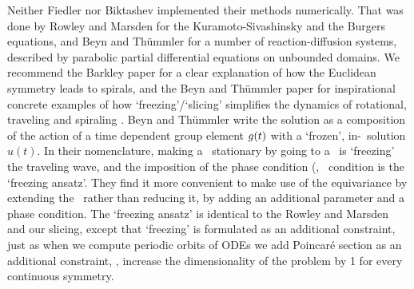 \documentclass[12pt]{article}
\begin{document}
{Neither Fiedler \etal{} nor Biktashev
\etal{} implemented their methods numerically.
That was done by Rowley and Marsden for the
Kuramoto-Sivashinsky and the
Burgers equations, and Beyn and
Th\"ummler for a number of
reaction-diffusion systems, described by parabolic partial
differential equations on unbounded domains. We recommend the
Barkley paper for a clear explanation of how
the Euclidean symmetry leads to spirals, and the Beyn and
Th\"ummler paper for inspirational concrete
examples of how `freezing'/\-`slicing' simplifies the
dynamics of rotational, traveling and spiraling \reqva.
Beyn and Th\"ummler write the solution as a composition of
the action of a time dependent group element $g(t)$ with
a `frozen', in-\slice\ solution $\hat{u}(t)$.
In their nomenclature, making a \reqv\
stationary by going to a \comovframe\ is `freezing' the
traveling wave, and the imposition of the phase condition
(\ie, \slice\ condition  is the `freezing
ansatz'.  They find it more convenient to make use of the
equi\-vari\-ance by extending the \statesp\ rather than reducing
it, by adding an additional parameter and a phase condition.
The `freezing ansatz' is identical to the Rowley
and Marsden and our slicing, except
that `freezing' is formulated as an additional constraint,
just as when we compute periodic orbits of ODEs we add
Poincar\'e section as an additional constraint, \ie, increase
the dimensionality of the problem by 1 for every continuous
symmetry.



}
\end{document}
